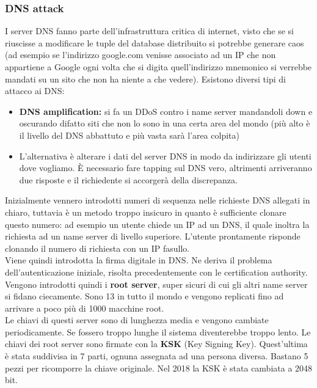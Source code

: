 \documentclass[10pt,a4paper,twoside]{article}
\begin{document}
\subsubsection{DNS attack}
I server DNS fanno parte dell'infrastruttura critica di internet, visto che se si riuscisse a modificare le tuple del database distribuito si potrebbe generare caos (ad esempio se l'indirizzo google.com venisse associato ad un IP che non appartiene a Google ogni volta che si digita quell'indirizzo mnemonico si verrebbe mandati su un sito che non ha niente a che vedere). Esistono diversi tipi di attacco ai DNS:
\begin{itemize}
\item \textbf{DNS amplification:} si fa un DDoS contro i name server mandandoli down e oscurando difatto siti che non lo sono in una certa area del mondo (più alto è il livello del DNS abbattuto e più vasta sarà l'area colpita)
\item L'alternativa è alterare i dati del server DNS in modo da indirizzare gli utenti dove vogliamo. È necessario fare tapping sul DNS vero, altrimenti arriveranno due risposte e il richiedente si accorgerà della discrepanza.
\end{itemize}
Inizialmente vennero introdotti numeri di sequenza nelle richieste DNS allegati in chiaro, tuttavia è un metodo troppo insicuro in quanto è sufficiente clonare questo numero: ad esempio un utente chiede un IP ad un DNS, il quale inoltra la richiesta ad un name server di livello superiore. L'utente prontamente risponde clonando il numero di richiesta con un IP fasullo.\\
Viene quindi introdotta la firma digitale in DNS. Ne deriva il problema dell'autenticazione iniziale, risolta precedentemente con le certification authority. Vengono introdotti quindi i \textbf{root server}, super sicuri di cui gli altri name server si fidano ciecamente. Sono 13 in tutto il mondo e vengono replicati fino ad arrivare a poco più di 1000 macchine root.\\
Le chiavi di questi server sono di lunghezza media e vengono cambiate periodicamente. Se fossero troppo lunghe il sistema diventerebbe troppo lento. Le chiavi dei root server sono firmate con la  \textbf{KSK} (Key Signing Key). Quest'ultima è stata suddivisa in 7 parti, ognuna assegnata ad una persona diversa. Bastano 5 pezzi per ricomporre la chiave originale. Nel 2018 la KSK è stata cambiata a 2048 bit.
\end{document}
